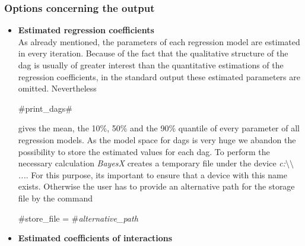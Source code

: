 \subsubsection*{Options concerning the output}
\begin{itemize}
\item {\bf\sffamily Estimated regression coefficients}\\
As already mentioned, the parameters of each regression model are
estimated in every iteration. Because of the fact that the
qualitative structure of the dag is usually of greater interest
than the quantitative estimations of the regression coefficients,
in the standard output these estimated parameters are omitted.
Nevertheless
\begin{center}
#print_dags#
\end{center}
gives the mean, the 10\%, 50\% and the 90\% quantile of every
parameter of all regression models.
As the model space for dags is very huge we abandon the
possibility to store the estimated values for each dag. To perform
the necessary calculation {\em BayesX} creates a temporary file
under the device {\em c:$\setminus\setminus$...}. For this
purpose, its important to ensure that a device with this name
exists. Otherwise the user has to provide an alternative path for
the storage file by the command
\begin{center}
#store_file = #{\em alternative\_path}
\end{center}
\item {\bf\sffamily Estimated coefficients of interactions}
\end{itemize}

